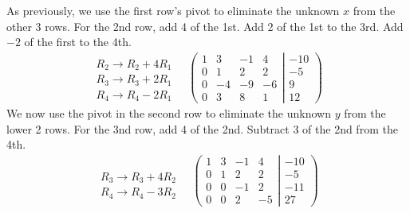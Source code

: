 \documentclass[usenames,dvipsnames,aspectratio=169,10pt]{beamer}
\numberwithin{equation}{section}
\begin{document}
\begin{frame}
As previously, we use the first row’s pivot to eliminate the unknown $x$ from the other 3 rows. For the 2nd row, add 4 of the 1st. Add 2 of the 1st to the 3rd. Add $-2$ of the first to the 4th.
\begin{align*}
\begin{array}{l}
   \\
 R_2 \to R_2 + 4R_1 \\
 R_3 \to R_3 + 2R_1 \\
 R_4 \to R_4 - 2R_1
\end{array}
\quad
\left(
	\begin{matrix}
	   1 &   3 & -1 &   4 \\
	   0 &   1 &  2 &   2 \\
	   0 &  -4 & -9 &  -6 \\
	   0 &   3 &  8 &   1
	\end{matrix}
  \left|
	\begin{matrix}
	 -10 \\
	  -5 \\
	   9 \\
	  12
	\end{matrix}
  \right.
\right)
\end{align*}
We now use the pivot in the second row to eliminate the unknown $y$ from the lower 2 rows. For the 3nd row, add 4 of the 2nd. Subtract 3 of the 2nd from the 4th.
\begin{align*}
\begin{array}{l}
   \\
   \\
 R_3 \to R_3 + 4R_2 \\
 R_4 \to R_4 - 3R_2
\end{array}
\quad
\left(
	\begin{matrix}
	   1 &   3 & -1 &   4 \\
	   0 &   1 &  2 &   2 \\
	   0 &   0 & -1 &   2 \\
	   0 &   0 &  2 &  -5
	\end{matrix}
  \left|
	\begin{matrix}
	 -10 \\
	  -5 \\
	 -11 \\
	  27
	\end{matrix}
  \right.
\right)
\end{align*}

\end{frame}
\end{document}
